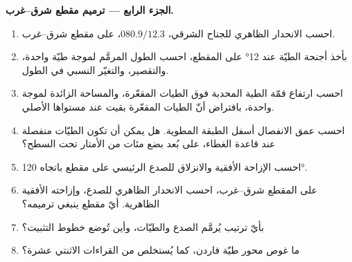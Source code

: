 \begin{problem}
\medskip\noindent\textbf{الجزء الرابع --- ترميم مقطع شرق--غرب.}
\begin{enumerate}[resume]
  \item احسب الانحدار الظاهري للجناح الشرقي، $080.9/12.3$، على مقطع
        شرق--غرب.
  \item بأخذ أجنحة الطيّة عند \ang{12} على المقطع، احسب الطول المرمَّم لموجة طيّة
        واحدة، والتقصير، والتغيّر النسبي
        في الطول.
  \item احسب ارتفاع قمّة الطية المحدبة فوق الطيات المقعّرة، والمساحة
        الزائدة لموجة واحدة، بافتراض أنّ الطيات المقعّرة بقيت
        عند مستواها الأصلي.
  \item احسب عمق الانفصال أسفل الطبقة المطوية. هل يمكن أن تكون الطيّات
        منفصلة عند قاعدة الغطاء، على بُعد بضع مئات من الأمتار
        تحت السطح؟
  \item احسب الإزاحة الأفقية والانزلاق للصدع الرئيسي على مقطع
        باتجاه \ang{120}.
  \item على المقطع شرق--غرب، احسب الانحدار الظاهري للصدع،
        وإزاحته الأفقية الظاهرية. أيّ مقطع ينبغي ترميمه؟
  \item بأيّ ترتيب يُرمَّم الصدع والطيّات، وأين
        تُوضع خطوط التثبيت؟
  \item ما غوص محور طيّة فاردن، كما يُستخلص من
        القراءات الاثنتي عشرة؟
\end{enumerate}
\end{problem}
